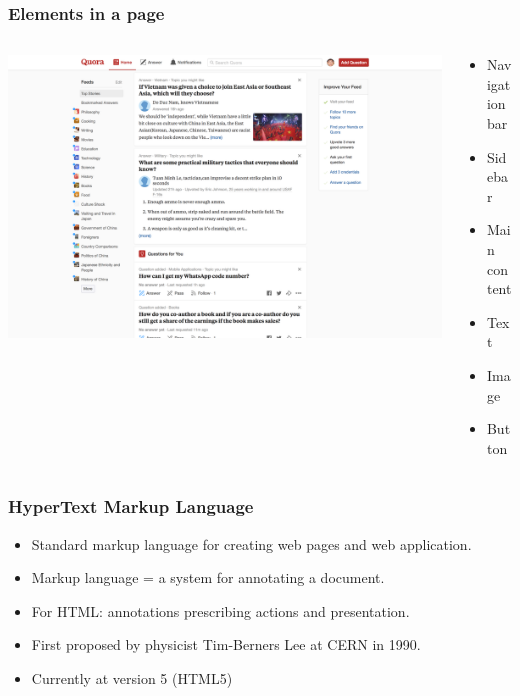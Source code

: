 \documentclass[12pt]{beamer}
\begin{document}
\begin{frame}
\frametitle{Elements in a page}
\begin{columns}
	\begin{column}{0.8\linewidth}
		\includegraphics[width=\linewidth]{quora}
	\end{column}
	\begin{column}{0.4\linewidth}
		\begin{itemize}
			\item Navigation bar
			\item Sidebar
			\item Main content
			\item Text
			\item Image
			\item Button
		\end{itemize}
	\end{column}
\end{columns}
\end{frame}

\begin{frame}
\frametitle{HyperText Markup Language}
\begin{itemize}
	\item Standard markup language for creating web pages and web application.
	\item Markup language = a system for annotating a document.
	\item For HTML: annotations prescribing actions and presentation.
	\item First proposed by physicist Tim-Berners Lee at CERN in 1990.
	\item Currently at version 5 (HTML5)
\end{itemize}
\end{frame}
\end{document}

